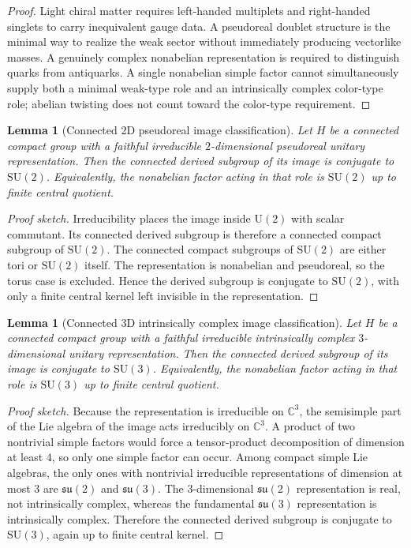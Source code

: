 \documentclass[11pt]{article}
\newtheorem{lemma}[theorem]{Lemma}
\newcommand{\SU}{\mathrm{SU}}
\newcommand{\U}{\mathrm{U}}
\begin{document}
\begin{proof}
Light chiral matter requires left-handed multiplets and right-handed singlets to carry inequivalent gauge data. A pseudoreal doublet structure is the minimal way to realize the weak sector without immediately producing vectorlike masses. A genuinely complex nonabelian representation is required to distinguish quarks from antiquarks. A single nonabelian simple factor cannot simultaneously supply both a minimal weak-type role and an intrinsically complex color-type role; abelian twisting does not count toward the color-type requirement.
\end{proof}

\begin{lemma}[Connected 2D pseudoreal image classification]\label{lem:su2class}
Let $H$ be a connected compact group with a faithful irreducible $2$-dimensional pseudoreal unitary representation. Then the connected derived subgroup of its image is conjugate to $\SU(2)$. Equivalently, the nonabelian factor acting in that role is $\SU(2)$ up to finite central quotient.
\end{lemma}

\begin{proof}[Proof sketch]
Irreducibility places the image inside $\U(2)$ with scalar commutant. Its connected derived subgroup is therefore a connected compact subgroup of $\SU(2)$. The connected compact subgroups of $\SU(2)$ are either tori or $\SU(2)$ itself. The representation is nonabelian and pseudoreal, so the torus case is excluded. Hence the derived subgroup is conjugate to $\SU(2)$, with only a finite central kernel left invisible in the representation.
\end{proof}

\begin{lemma}[Connected 3D intrinsically complex image classification]\label{lem:su3class}
Let $H$ be a connected compact group with a faithful irreducible intrinsically complex $3$-dimensional unitary representation. Then the connected derived subgroup of its image is conjugate to $\SU(3)$. Equivalently, the nonabelian factor acting in that role is $\SU(3)$ up to finite central quotient.
\end{lemma}

\begin{proof}[Proof sketch]
Because the representation is irreducible on $\mathbb C^3$, the semisimple part of the Lie algebra of the image acts irreducibly on $\mathbb C^3$. A product of two nontrivial simple factors would force a tensor-product decomposition of dimension at least $4$, so only one simple factor can occur. Among compact simple Lie algebras, the only ones with nontrivial irreducible representations of dimension at most $3$ are $\mathfrak{su}(2)$ and $\mathfrak{su}(3)$. The $3$-dimensional $\mathfrak{su}(2)$ representation is real, not intrinsically complex, whereas the fundamental $\mathfrak{su}(3)$ representation is intrinsically complex. Therefore the connected derived subgroup is conjugate to $\SU(3)$, again up to finite central kernel.
\end{proof}
\end{document}

